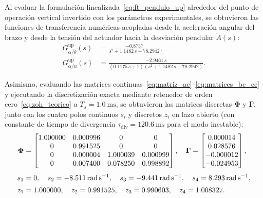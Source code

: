 Al evaluar la formulación linealizada~\eqref{eq:ft_pendulo_up} alrededor del punto de operación vertical invertido con los parámetros experimentales, se obtuvieron las funciones de transferencia numéricas acopladas desde la aceleración angular del brazo y desde la tensión del actuador hacia la desviación pendular $\tilde{A}(s)$:
\begin{equation}
    \begin{aligned}
        G_{\alpha/\ddot{\theta}}^{\text{up}}(s) &= \frac{-0.8737}{s^2 + 1.1482\,s - 78.2942}, \\[4pt]
        G_{\alpha/u}^{\text{up}}(s) &= \frac{-2.9461\,s}{(0.1175\,s + 1)(s^2 + 1.1482\,s - 78.2942)}.
    \end{aligned}
    \label{eq:ft_pendulo_num}
\end{equation}

Asimismo, evaluando las matrices continuas~\eqref{eq:matriz_ac}--\eqref{eq:matrices_bc_cc} y ejecutando la discretización exacta mediante retenedor de orden cero~\eqref{eq:zoh_teorico} a $T_s=\qty{1.0}{\milli\second}$, se obtuvieron las matrices discretas $\mathbf{\Phi}$ y $\mathbf{\Gamma}$, junto con los cuatro polos continuos $s_i$ y discretos $z_i$ en lazo abierto (con constante de tiempo de divergencia $\tau_{\text{div}}=\qty{120.6}{\milli\second}$ para el modo inestable):
\begin{equation}
\resizebox{0.94\columnwidth}{!}{$\displaystyle
    \begin{aligned}
        \mathbf{\Phi} &= \begin{bmatrix}
            1.000000 & 0.000996 & 0 & 0 \\
            0 & 0.991525 & 0 & 0 \\
            0 & 0.000004 & 1.000039 & 0.000999 \\
            0 & 0.007400 & 0.078250 & 0.998892
        \end{bmatrix}, \quad
        \mathbf{\Gamma} = \begin{bmatrix}
            0.000014 \\
            0.028576 \\
            -0.000012 \\
            -0.024953
        \end{bmatrix}, \\[4pt]
        s_1 &= 0, \quad s_2 = \qty{-8.511}{\radian\per\second}, \quad s_3 = \qty{-9.441}{\radian\per\second}, \quad s_4 = \qty{+8.293}{\radian\per\second}, \\[2pt]
        z_1 &= 1.000000, \quad z_2 = 0.991525, \quad z_3 = 0.990603, \quad z_4 = 1.008327.
    \end{aligned}
$}
    \label{eq:zoh_discreto}
\end{equation}

